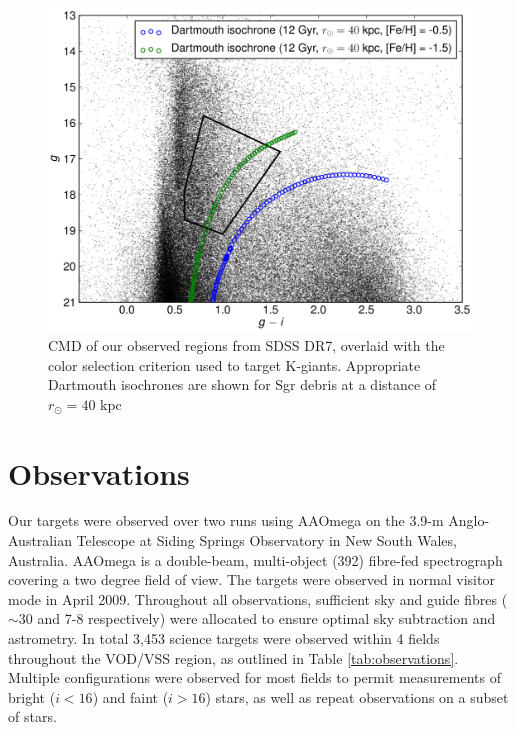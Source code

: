 \documentclass[preprint2]{aastex}
\begin{document}
\begin{figure}[h]
	\includegraphics[width=\columnwidth]{./cmd_selection.eps}
	\caption{CMD of our observed regions from SDSS DR7, overlaid with the color selection criterion used to target K-giants. Appropriate Dartmouth isochrones \citep{Dotter;et-al_2008} are shown for Sgr debris at a distance of $r_\odot =40$ kpc \citep{Belokurov;et-al_2006}}
	\label{fig:cmd-target-selection}
\end{figure}

\section{Observations}
\label{sec:observations}

Our targets were observed over two runs using AAOmega on the 3.9-m Anglo-Australian Telescope at Siding Springs Observatory in New South Wales, Australia. AAOmega is a double-beam, multi-object (392) fibre-fed spectrograph covering a two degree field of view. The targets were observed in normal visitor mode in April 2009. Throughout all observations, sufficient sky and guide fibres ($\sim30$ and 7-8 respectively) were allocated to ensure optimal sky subtraction and astrometry. In total 3,453 science targets were observed within 4 fields throughout the VOD/VSS region, as outlined in Table \ref{tab:observations}. Multiple configurations were observed for most fields to permit measurements of bright ($i < 16$) and faint ($i > 16$) stars, as well as repeat observations on a subset of stars.

\end{document}
